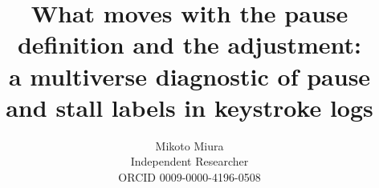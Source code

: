 \documentclass[notitlepage,12pt]{jedm}
\begin{document}
\title{What moves with the pause definition and the adjustment:\\ a multiverse diagnostic of pause and stall labels in keystroke logs}
\date{}
\author{{\large Mikoto Miura}\\Independent Researcher\\ORCID 0009-0000-4196-0508}

\maketitle
















\appendix

\end{document}
